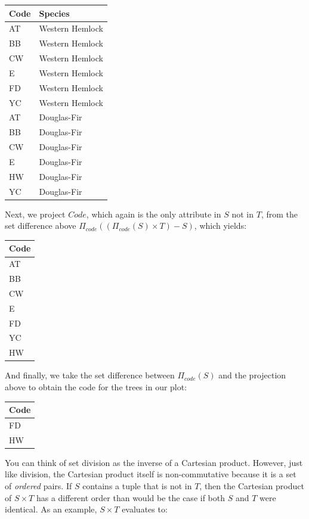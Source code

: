 \documentclass[
]{book}
\begin{document}
\begin{tabular}{ll}
\toprule
Code & Species\\
\midrule
AT & Western Hemlock\\
BB & Western Hemlock\\
CW & Western Hemlock\\
E & Western Hemlock\\
FD & Western Hemlock\\
\addlinespace
YC & Western Hemlock\\
AT & Douglas-Fir\\
BB & Douglas-Fir\\
CW & Douglas-Fir\\
E & Douglas-Fir\\
\addlinespace
HW & Douglas-Fir\\
YC & Douglas-Fir\\
\bottomrule
\end{tabular}

Next, we project \(Code\), which again is the only attribute in \(S\) not in \(T\), from the set difference above \(Π_{code}((Π_{code}(S) × T) - S)\), which yields:

\begin{tabular}{l}
\toprule
Code\\
\midrule
AT\\
BB\\
CW\\
E\\
FD\\
\addlinespace
YC\\
HW\\
\bottomrule
\end{tabular}

And finally, we take the set difference between \(Π_{code}(S)\) and the projection above to obtain the code for the trees in our plot:

\begin{tabular}{l}
\toprule
Code\\
\midrule
FD\\
HW\\
\bottomrule
\end{tabular}

You can think of set division as the inverse of a Cartesian product. However, just like division, the Cartesian product itself is non-commutative because it is a set of \emph{ordered} pairs. If \(S\) contains a tuple that is not in \(T\), then the Cartesian product of \(S×T\) has a different order than would be the case if both \(S\) and \(T\) were identical. As an example, \(S×T\) evaluates to:
\end{document}

